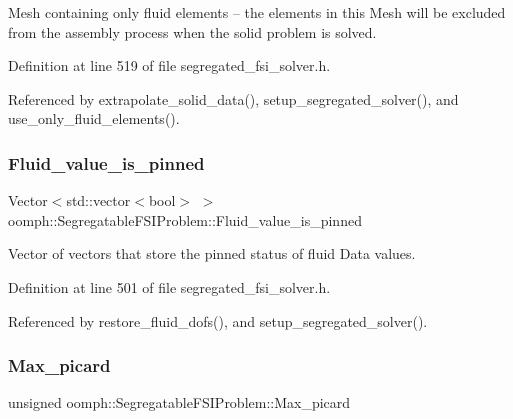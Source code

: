 Mesh containing only fluid elements -- the elements in this Mesh will be excluded from the assembly process when the solid problem is solved. 



Definition at line 519 of file segregated\+\_\+fsi\+\_\+solver.\+h.



Referenced by extrapolate\+\_\+solid\+\_\+data(), setup\+\_\+segregated\+\_\+solver(), and use\+\_\+only\+\_\+fluid\+\_\+elements().

\mbox{\label{classoomph_1_1SegregatableFSIProblem_aa39b7f8499588b28b9b490771c4bcff2}} 
\subsubsection{\texorpdfstring{Fluid\+\_\+value\+\_\+is\+\_\+pinned}{Fluid\_value\_is\_pinned}}
{\footnotesize\ttfamily Vector$<$std\+::vector$<$bool$>$ $>$ oomph\+::\+Segregatable\+F\+S\+I\+Problem\+::\+Fluid\+\_\+value\+\_\+is\+\_\+pinned\hspace{0.3cm}{\ttfamily [protected]}}



Vector of vectors that store the pinned status of fluid Data values. 



Definition at line 501 of file segregated\+\_\+fsi\+\_\+solver.\+h.



Referenced by restore\+\_\+fluid\+\_\+dofs(), and setup\+\_\+segregated\+\_\+solver().

\mbox{\label{classoomph_1_1SegregatableFSIProblem_aa2a06cb9517d1f183cdbaa20ea077805}} 
\subsubsection{\texorpdfstring{Max\+\_\+picard}{Max\_picard}}
{\footnotesize\ttfamily unsigned oomph\+::\+Segregatable\+F\+S\+I\+Problem\+::\+Max\+\_\+picard\hspace{0.3cm}{\ttfamily [protected]}}



